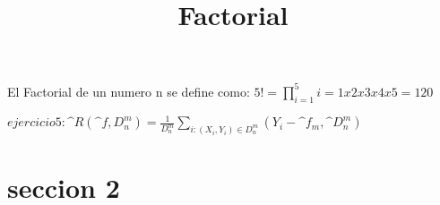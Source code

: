 \documentclass[a4paper]{article}
\title{Factorial}
\begin{document}
	\maketitle
El Factorial de un numero n se define como: $5! = \prod_{i=1}^{5} i = 1x2x3x4x5 = 120$


$ejercicio 5: \^{R}(\^{f},D^{m}_{n}) = \frac{1}{D^{m}_{n}} \sum_{i:(X_{i},Y_{i}) \in D_{n}^{m}}(Y_{i}- \^{f}_{m},\^{D}_{n}^{m}) $

\section{seccion 2}
\end{document}
